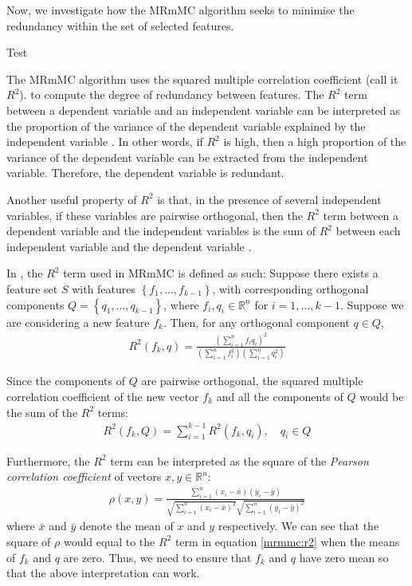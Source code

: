 \documentclass[12pt, twoside, a4paper]{report}
\begin{document}
Now, we investigate how the MRmMC algorithm seeks to minimise the redundancy within the set of selected features.

\begin{mydef}[Multicollinearity]
Test
\end{mydef}

The MRmMC algorithm uses the squared multiple correlation coefficient (call it $R^2$). to compute the degree of redundancy between features. The $R^2$ term between a dependent variable and an independent variable can be interpreted as the proportion of the variance of the dependent variable explained by the independent variable \cite{RefWorks:193}.  In other words, if $R^2$ is high, then a high proportion of the variance of the dependent variable can be extracted from the independent variable. Therefore, the dependent variable is redundant.

Another useful property of $R^2$ is that, in the presence of several independent variables, if these variables are pairwise orthogonal, then the $R^2$ term between a dependent variable and the independent variables is the sum of $R^2$ between each independent variable and the dependent variable \cite{RefWorks:193}.

In \cite{RefWorks:187}, the $R^2$ term used in MRmMC is defined as such: Suppose there exists a feature set $S$ with features $\left\lbrace f_1 , \dots , f_{k-1} \right\rbrace$, with corresponding orthogonal components $Q= \left\lbrace q_1, \dots , q_{k-1} \right\rbrace$, where $f_i, q_i \in \mathbb{R}^n$ for $i=1, \dots, k-1$. Suppose we are considering a new feature $f_k$. Then, for any orthogonal component $q \in Q$,
\begin{align}
R^2(f_k, q) = \frac{\left( \sum_{i=1}^n f_iq_i \right)^2}{\left(\sum_{i=1}^n f_i^2 \right) \left( \sum_{i=1}^n q_i^2 \right)} \label{mrmmc:r2}
\end{align}

Since the components of $Q$ are pairwise orthogonal, the squared multiple correlation coefficient of the new vector $f_k$ and all the components of $Q$ would be the sum of the $R^2$ terms:
\begin{align*}
R^2(f_k, Q) = \sum_{i=1}^{k-1} R^2(f_k, q_i), \quad q_i \in Q
\end{align*}

Furthermore, the $R^2$ term can be interpreted as the square of the \textit{Pearson correlation coefficient} of vectors $x,y \in \mathbb{R}^n$:
\begin{align*}
\rho(x, y) = \frac{\sum_{i=1}^n (x_i - \bar{x})(y_i - \bar{y})}{\sqrt{\sum_{i=1}^n (x_i-\bar{x})^2}\sqrt{\sum_{i=1}^n (y_i-\bar{y})^2}}
\end{align*}
where $\bar{x}$ and $\bar{y}$ denote the mean of $x$ and $y$ respectively. We can see that the square of $\rho$ would equal to the $R^2$ term in equation \ref{mrmmc:r2} when the means of $f_k$ and $q$ are zero. Thus, we need to ensure that $f_k$ and $q$ have zero mean so that the above interpretation can work.
\end{document}
